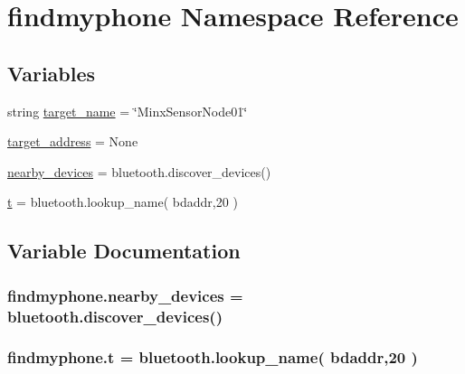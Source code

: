 \hypertarget{namespacefindmyphone}{}\section{findmyphone Namespace Reference}
\label{namespacefindmyphone}
\subsection*{Variables}
\begin{DoxyCompactItemize}
\item 
string \hyperlink{namespacefindmyphone_aa120ec9c3e51eeeae0130cf9ce402672}{target\+\_\+name} = \char`\"{}Minx\+Sensor\+Node01\char`\"{}
\item 
\hyperlink{namespacefindmyphone_a8af8877c5d59f0e0cea959d3fb0611aa}{target\+\_\+address} = None
\item 
\hyperlink{namespacefindmyphone_a866f605dd8a21d61188a281fba66808c}{nearby\+\_\+devices} = bluetooth.\+discover\+\_\+devices()
\item 
\hyperlink{namespacefindmyphone_ae87ee29765ed9aaf12d3dfef515ce1a7}{t} = bluetooth.\+lookup\+\_\+name( bdaddr,20 )
\end{DoxyCompactItemize}


\subsection{Variable Documentation}
\subsubsection[{\texorpdfstring{nearby\+\_\+devices}{nearby_devices}}]{\setlength{\rightskip}{0pt plus 5cm}findmyphone.\+nearby\+\_\+devices = bluetooth.\+discover\+\_\+devices()}\hypertarget{namespacefindmyphone_a866f605dd8a21d61188a281fba66808c}{}\label{namespacefindmyphone_a866f605dd8a21d61188a281fba66808c}
\subsubsection[{\texorpdfstring{t}{t}}]{\setlength{\rightskip}{0pt plus 5cm}findmyphone.\+t = bluetooth.\+lookup\+\_\+name( bdaddr,20 )}\hypertarget{namespacefindmyphone_ae87ee29765ed9aaf12d3dfef515ce1a7}{}\label{namespacefindmyphone_ae87ee29765ed9aaf12d3dfef515ce1a7}
